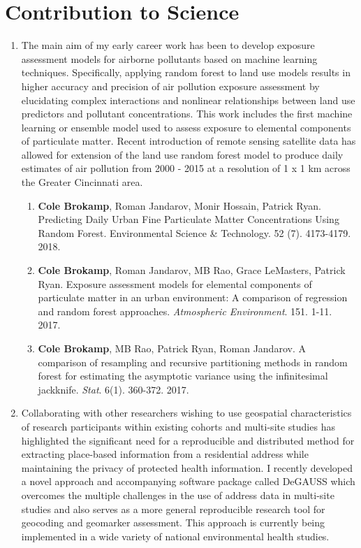 \documentclass{nihbiosketch}
\begin{document}

\section{Contribution to Science}

\begin{enumerate}


\item The main aim of my early career work has been to develop exposure assessment models for airborne pollutants based on machine learning techniques.  Specifically, applying random forest to land use models results in higher accuracy and precision of air pollution exposure assessment by elucidating complex interactions and nonlinear relationships between land use predictors and pollutant concentrations. This work includes the first machine learning or ensemble model used to assess exposure to elemental components of particulate matter. Recent introduction of remote sensing satellite data has allowed for extension of the land use random forest model to produce daily estimates of air pollution from 2000 - 2015 at a resolution of 1 x 1 km across the Greater Cincinnati area.

\begin{enumerate}
	
	\item \textbf{Cole Brokamp}, Roman Jandarov, Monir Hossain, Patrick Ryan. Predicting Daily Urban Fine Particulate Matter Concentrations Using Random Forest. Environmental Science \& Technology. 52 (7). 4173-4179. 2018.

	\item \textbf{Cole Brokamp}, Roman Jandarov, MB Rao, Grace LeMasters, Patrick Ryan. Exposure assessment models for elemental components of particulate matter in an urban environment: A comparison of regression and random forest approaches. \textit{Atmospheric Environment}. 151. 1-11. 2017.
	
	\item \textbf{Cole Brokamp}, MB Rao, Patrick Ryan, Roman Jandarov. A comparison of resampling and recursive partitioning methods in random forest for estimating the asymptotic variance using the infinitesimal jackknife. \textit{Stat}. 6(1). 360-372. 2017.

\end{enumerate}

\item Collaborating with other researchers wishing to use geospatial characteristics of research participants within existing cohorts and multi-site studies has highlighted the significant need for a reproducible and distributed method for extracting place-based information from a residential address while maintaining the privacy of protected health information. I recently developed a novel approach and accompanying software package called DeGAUSS which overcomes the multiple challenges in the use of address data in multi-site studies and also serves as a more general reproducible research tool for geocoding and geomarker assessment. This approach is currently being implemented in a wide variety of national environmental health studies.


\end{enumerate}
\end{document}
